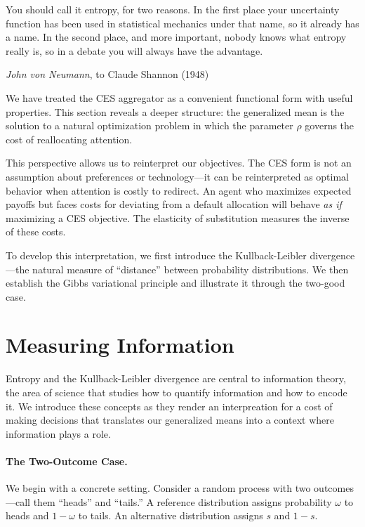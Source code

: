 \epigraph{You should call it entropy, for two reasons. In the first place your uncertainty function has been used in statistical mechanics under that name, so it already has a name. In the second place, and more important, nobody knows what entropy really is, so in a debate you will always have the advantage.}{\textit{John von Neumann}, to Claude Shannon (1948)}


We have treated the CES aggregator as a convenient functional form with useful properties. This section reveals a deeper structure: the generalized mean is the solution to a natural optimization problem in which the parameter $\rho$ governs the cost of reallocating attention.

This perspective allows us to reinterpret our objectives. The CES form is not an assumption about preferences or technology---it can be reinterpreted as optimal behavior when attention is costly to redirect. An agent who maximizes expected payoffs but faces costs for deviating from a default allocation will behave \emph{as if} maximizing a CES objective. The elasticity of substitution measures the inverse of these costs.

To develop this interpretation, we first introduce the Kullback-Leibler divergence---the natural measure of ``distance'' between probability distributions. We then establish the Gibbs variational principle and illustrate it through the two-good case.

\section{Measuring Information}
Entropy and the Kullback-Leibler divergence are central to information theory, the area of science that studies how to quantify information and how to encode it. We introduce these concepts as they render an interpreation for a cost of making decisions that translates our generalized means into a context where information plays a role.

\paragraph{The Two-Outcome Case.}

We begin with a concrete setting. Consider a random process with two outcomes---call them ``heads'' and ``tails.'' A reference distribution assigns probability $\omega$ to heads and $1-\omega$ to tails. An alternative distribution assigns $s$ and $1-s$.

